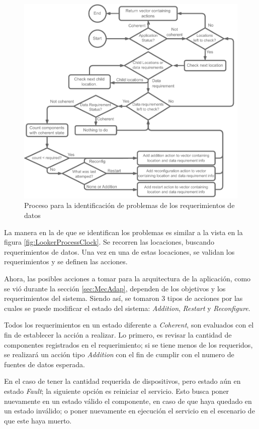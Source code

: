 \begin{figure}[ht]
    \centering
    \caption{Proceso para la identificación de problemas de los requerimientos de datos}
    \label{fig:BranProcess}
    \includegraphics[width=0.85\linewidth]{images/BranProcessPlanner.pdf}
\end{figure}

La manera en la de que se identifican los problemas es similar a la vista en la figura \ref{fig:LookerProcessClock}. Se recorren las locaciones, buscando requerimientos de datos. Una vez en una de estas locaciones, se validan los requerimientos y se definen las acciones.

Ahora, las posibles acciones a tomar para la arquitectura de la aplicación, como se vió durante la sección \ref{sec:MecAdap}, dependen de los objetivos y los requerimientos del sistema. Siendo así, se tomaron 3 tipos de acciones por las cuales se puede modificar el estado del sistema: \textit{Addition}, \textit{Restart} y \textit{Reconfigure}.

Todos los requerimientos en un estado diferente a \textit{Coherent}, son evaluados con el fin de establecer la acción a realizar. Lo primero, es revisar la cantidad de componentes registrados en el requerimiento; si se tiene menos de los requeridos, se realizará un acción tipo \textit{Addition} con el fin de cumplir con el numero de fuentes de datos esperada.

En el caso de tener la cantidad requerida de dispositivos, pero estado aún en estado \textit{Fault}; la siguiente opción es reiniciar el servicio. Esto busca poner nuevamente en un estado válido el componente, en caso de que haya quedado en un estado inválido; o poner nuevamente en ejecución el servicio en el escenario de que este haya muerto.

